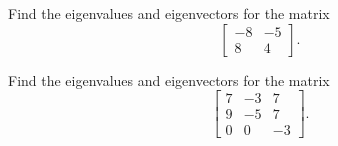 \documentclass{ximera}
\begin{document}
\begin{exercise}%
    Find the eigenvalues and eigenvectors for the matrix
    \[ 
        \begin{bmatrix} 
            -8 & -5 \\ 
            8 & 4
        \end{bmatrix}. 
    \]
\end{exercise}

\begin{exercise}%
    Find the eigenvalues and eigenvectors for the matrix
    \[ 
        \begin{bmatrix} 
            7 & -3 & 7 \\ 
            9 & -5 & 7 \\ 
            0 & 0 & -3
        \end{bmatrix}. 
    \]
\end{exercise}
\end{document}

